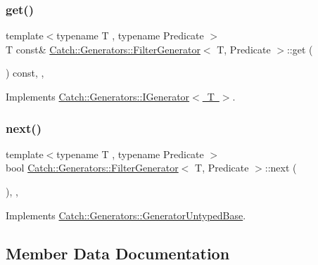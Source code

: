 \subsubsection{\texorpdfstring{get()}{get()}}
{\footnotesize\ttfamily template$<$typename T , typename Predicate $>$ \\
T const\& \mbox{\hyperlink{class_catch_1_1_generators_1_1_filter_generator}{Catch\+::\+Generators\+::\+Filter\+Generator}}$<$ T, Predicate $>$\+::get (\begin{DoxyParamCaption}{ }\end{DoxyParamCaption}) const\hspace{0.3cm}{\ttfamily [inline]}, {\ttfamily [override]}, {\ttfamily [virtual]}}



Implements \mbox{\hyperlink{struct_catch_1_1_generators_1_1_i_generator_a525d381fc9249a885b075a0632a8579a}{Catch\+::\+Generators\+::\+I\+Generator$<$ T $>$}}.

\mbox{\label{class_catch_1_1_generators_1_1_filter_generator_a02ce0839dcaa7545c55d0fe70cc50e84}} 
\subsubsection{\texorpdfstring{next()}{next()}}
{\footnotesize\ttfamily template$<$typename T , typename Predicate $>$ \\
bool \mbox{\hyperlink{class_catch_1_1_generators_1_1_filter_generator}{Catch\+::\+Generators\+::\+Filter\+Generator}}$<$ T, Predicate $>$\+::next (\begin{DoxyParamCaption}{ }\end{DoxyParamCaption})\hspace{0.3cm}{\ttfamily [inline]}, {\ttfamily [override]}, {\ttfamily [virtual]}}



Implements \mbox{\hyperlink{class_catch_1_1_generators_1_1_generator_untyped_base_aeed3c0cd6233c5f553549e453b8d6638}{Catch\+::\+Generators\+::\+Generator\+Untyped\+Base}}.



\subsection{Member Data Documentation}
\mbox{\label{class_catch_1_1_generators_1_1_filter_generator_a6fb6975b1401cf7bd7e76e3a542a45cf}} 
